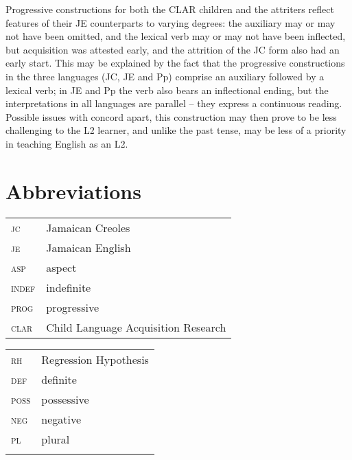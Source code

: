\documentclass[output=paper,colorlinks,citecolor=brown]{langscibook}
\begin{document}
Progressive constructions for both the CLAR children and the attriters reflect features of their JE counterparts to varying degrees: the auxiliary may or may not have been omitted, and the lexical verb may or may not have been inflected, but acquisition was attested early, and the attrition of the JC form also had an early start.  This may be explained by the fact that the progressive constructions in the three languages (JC, JE and Pp) comprise an auxiliary followed by a lexical verb; in JE and Pp the verb also bears an inflectional ending, but the interpretations in all languages are parallel – they express a continuous reading. Possible issues with concord apart, this construction may then prove to be less challenging to the L2 learner, and unlike the past tense, may be less of a priority in teaching English as an L2.


\section*{Abbreviations}
\begin{tabularx}{.6\textwidth}{@{}ll}
\textsc{jc} & Jamaican Creoles\\
\textsc{je} & Jamaican English\\
\textsc{asp} & aspect\\
\textsc{indef} & indefinite\\
\textsc{prog} & progressive \\
\textsc{clar} & Child Language Acquisition Research\\
\end{tabularx}%
\begin{tabularx}{.4\textwidth}{ll@{}}
\textsc{rh} &  Regression Hypothesis\\
\textsc{def} & definite \\
\textsc{poss} & possessive\\
\textsc{neg} & negative \\
\textsc{pl} & plural\\
\\
\end{tabularx}


\printbibliography[heading=subbibliography,notkeyword=this]
\end{document}
